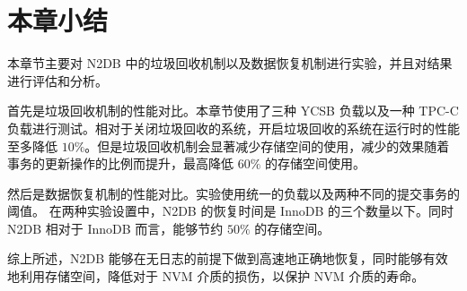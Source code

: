 \section{本章小结}

本章节主要对 N2DB 中的垃圾回收机制以及数据恢复机制进行实验，并且对结果进行评估和分析。

首先是垃圾回收机制的性能对比。本章节使用了三种 YCSB 负载以及一种 TPC-C 负载进行测试。相对于关闭垃圾回收的系统，开启垃圾回收的系统在运行时的性能至多降低 $10\%$。但是垃圾回收机制会显著减少存储空间的使用，减少的效果随着事务的更新操作的比例而提升，最高降低 $60\%$ 的存储空间使用。

然后是数据恢复机制的性能对比。实验使用统一的负载以及两种不同的提交事务的阈值。
在两种实验设置中，N2DB 的恢复时间是 InnoDB 的三个数量以下。同时 N2DB 相对于 InnoDB 而言，能够节约 $50\%$ 的存储空间。

综上所述，N2DB 能够在无日志的前提下做到高速地正确地恢复，同时能够有效地利用存储空间，降低对于 NVM 介质的损伤，以保护 NVM 介质的寿命。

